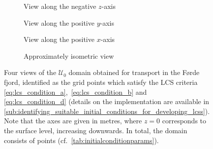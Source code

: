 \begin{figure}[htpb]
    \centering
    \begin{subfigure}[b]{0.475\textwidth}
        \centering
        \caption[]{{\small View along the negative $z$-axis}}
        \label{fig:fjord_abd_z}
    \end{subfigure}
    \begin{subfigure}[b]{0.475\textwidth}
        \centering
        \caption[]{{\small View along the positive $y$-axis}}
        \label{fig:fjord_abd_y}
    \end{subfigure}

    \begin{subfigure}[b]{0.475\textwidth}
        \centering
        \caption[]{{\small View along the positive $x$-axis}}
        \label{fig:fjord_abd_x}
    \end{subfigure}
    \begin{subfigure}[b]{0.475\textwidth}
        \centering
        \caption[]{{\small Approximately isometric view}}
        \label{fig:fjord_abd_isometric}
    \end{subfigure}
    \caption[Four views of the $\mathcal{U}_{0}$ domain obtained for transport
    in the Førde fjord]
    {
        Four views of the $\mathcal{U}_{0}$ domain obtained for transport in
        the Førde fjord, identified as the grid points which satisfy the
        LCS criteria \eqref{eq:lcs_condition_a},~\eqref{eq:lcs_condition_b} and~
        \eqref{eq:lcs_condition_d} (details on the implementation are available
        in
        \cref{sub:identifying_suitable_initial_conditions_for_developing_lcss}).
        Note that the axes are given in metres, where $z=0$ corresponds to
        the surface level, increasing downwards. In total, the domain consists
        of  points (cf.\ \cref{tab:initialconditionparams}).
}
    \label{fig:fjord_abd}
\end{figure}

